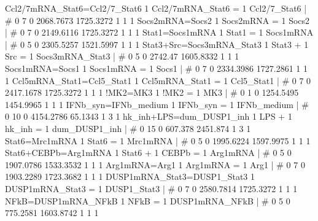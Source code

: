 Ccl2/7mRNA_Stat6=Ccl2/7_Stat6                       	1 Ccl2/7mRNA_Stat6 = 1 Ccl2/7_Stat6 	| 	# 	0              7              0      2068.7673      1725.3272              1              1              1 
Socs2mRNA=Socs2                                     	1 Socs2mRNA = 1 Socs2 	| 	# 	0              7              0      2149.6116      1725.3272              1              1              1 
Stat1=Socs1mRNA                                     	1 Stat1 = 1 Socs1mRNA 	| 	# 	0              5              0      2305.5257      1521.5997              1              1              1 
Stat3+Src=Socs3mRNA_Stat3                           	1 Stat3 + 1 Src = 1 Socs3mRNA_Stat3 	| 	# 	0              5              0        2742.47      1605.8332              1              1              1 
Socs1mRNA=Socs1                                     	1 Socs1mRNA = 1 Socs1 	| 	# 	0              7              0      2334.3986      1727.2861              1              1              1 
Ccl5mRNA_Stat1=Ccl5_Stat1                           	1 Ccl5mRNA_Stat1 = 1 Ccl5_Stat1 	| 	# 	0              7              0      2417.1678      1725.3272              1              1              1 
!MK2=MK3                                            	1 !MK2 = 1 MK3 	| 	# 	0              1              0      1254.5495      1454.9965              1              1              1 
IFNb_syn=IFNb_medium                                	1 IFNb_syn = 1 IFNb_medium 	| 	# 	0             10              0      4154.2786        65.1343              1              3              1 
hk_inh+LPS=dum_DUSP1_inh                            	1 LPS + 1 hk_inh = 1 dum_DUSP1_inh 	| 	# 	0             15              0        607.378       2451.874              1              3              1 
Stat6=Mrc1mRNA                                      	1 Stat6 = 1 Mrc1mRNA 	| 	# 	0              5              0      1995.6224      1597.9975              1              1              1 
Stat6+CEBPb=Arg1mRNA                                	1 Stat6 + 1 CEBPb = 1 Arg1mRNA 	| 	# 	0              5              0      1907.0786      1533.3532              1              1              1 
Arg1mRNA=Arg1                                       	1 Arg1mRNA = 1 Arg1 	| 	# 	0              7              0      1903.2289      1723.3682              1              1              1 
DUSP1mRNA_Stat3=DUSP1_Stat3                         	1 DUSP1mRNA_Stat3 = 1 DUSP1_Stat3 	| 	# 	0              7              0      2580.7814      1725.3272              1              1              1 
NFkB=DUSP1mRNA_NFkB                                 	1 NFkB = 1 DUSP1mRNA_NFkB 	| 	# 	0              5              0       775.2581      1603.8742              1              1              1 

